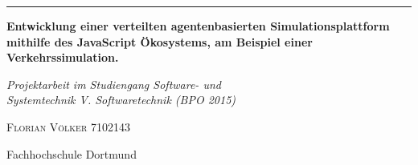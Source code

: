 \begin{titlepage} %


    \rule{1pt}{\textheight} %
    \hspace{0.05\textwidth} %
    \parbox[b]{0.97\textwidth}{ %
        \RaggedRight %

        {\fontsize{23pt}{23pt}\selectfont\textbf{Entwicklung einer verteilten agentenbasierten Simulationsplattform mithilfe des Java\-Script Ökosystems, am Beispiel einer Verkehrssimulation.}
        \par}
        \bigskip
        {\large\textit{Projektarbeit im Studiengang Software- und \\ Systemtechnik V. Softwaretechnik (BPO 2015)}\par} %
        \bigskip
        {\Large\textsc{Florian Völker 7102143}\par} %

        \vspace{0.25\textheight} %

        {\noindent Fachhochschule Dortmund} %
        \bigskip
    }


    \afterpage{
        \null
        \thispagestyle{empty}
        \newpage
    }

\end{titlepage}

